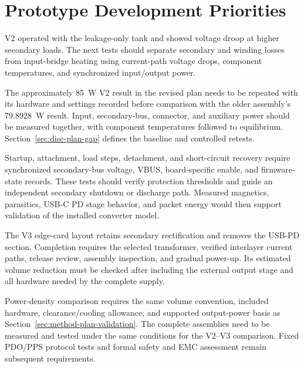 \section{Prototype Development Priorities}
\label{sec:disc-future}

V2 operated with the leakage-only tank and showed voltage droop at higher secondary loads. The next tests should separate secondary and winding losses from input-bridge heating using current-path voltage drops, component temperatures, and synchronized input/output power.

The approximately \SI{85}{\watt} V2 result in the revised plan
\cite{projectOctoberPlan} needs to be repeated with its hardware and settings recorded
before comparison with the older assembly's
\SI{79.8928}{\watt} result. Input, secondary-bus, connector, and auxiliary
power should be measured together, with component temperatures followed
to equilibrium. Section~\ref{sec:disc-plan-gap} defines the baseline and
controlled retests.

Startup, attachment, load steps, detachment, and short-circuit recovery
require synchronized secondary-bus voltage, VBUS, board-specific enable,
and firmware-state records. These tests should verify protection
thresholds and guide an independent secondary shutdown or discharge path.
Measured magnetics, parasitics, USB-C PD stage behavior, and packet
energy would then support validation of the installed converter model.

The V3 edge-card layout retains secondary rectification and removes the
USB-PD section. Completion requires the selected transformer, verified
interlayer current paths, release review, assembly inspection, and gradual
power-up. Its estimated volume reduction must be checked after including the
external output stage and all hardware needed by the complete supply.

Power-density comparison requires the same volume convention, included
hardware, clearance/cooling allowance, and supported output-power basis
as Section~\ref{sec:method-plan-validation}. The complete assemblies need
to be measured and tested under the same conditions for the V2--V3 comparison. Fixed PDO/PPS protocol tests and formal
safety and EMC assessment remain subsequent requirements.
